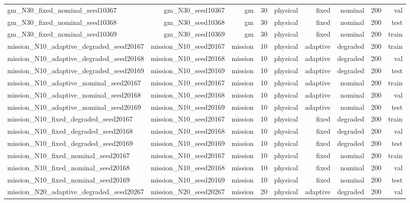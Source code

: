 \begin{tabular}{lrrrrrrrr}
gm\_N30\_fixed\_nominal\_seed10367 & gm\_N30\_seed10367 & gm & 30 & physical & fixed & nominal & 200 & val \\
gm\_N30\_fixed\_nominal\_seed10368 & gm\_N30\_seed10368 & gm & 30 & physical & fixed & nominal & 200 & test \\
gm\_N30\_fixed\_nominal\_seed10369 & gm\_N30\_seed10369 & gm & 30 & physical & fixed & nominal & 200 & train \\
mission\_N10\_adaptive\_degraded\_seed20167 & mission\_N10\_seed20167 & mission & 10 & physical & adaptive & degraded & 200 & train \\
mission\_N10\_adaptive\_degraded\_seed20168 & mission\_N10\_seed20168 & mission & 10 & physical & adaptive & degraded & 200 & val \\
mission\_N10\_adaptive\_degraded\_seed20169 & mission\_N10\_seed20169 & mission & 10 & physical & adaptive & degraded & 200 & test \\
mission\_N10\_adaptive\_nominal\_seed20167 & mission\_N10\_seed20167 & mission & 10 & physical & adaptive & nominal & 200 & train \\
mission\_N10\_adaptive\_nominal\_seed20168 & mission\_N10\_seed20168 & mission & 10 & physical & adaptive & nominal & 200 & val \\
mission\_N10\_adaptive\_nominal\_seed20169 & mission\_N10\_seed20169 & mission & 10 & physical & adaptive & nominal & 200 & test \\
mission\_N10\_fixed\_degraded\_seed20167 & mission\_N10\_seed20167 & mission & 10 & physical & fixed & degraded & 200 & train \\
mission\_N10\_fixed\_degraded\_seed20168 & mission\_N10\_seed20168 & mission & 10 & physical & fixed & degraded & 200 & val \\
mission\_N10\_fixed\_degraded\_seed20169 & mission\_N10\_seed20169 & mission & 10 & physical & fixed & degraded & 200 & test \\
mission\_N10\_fixed\_nominal\_seed20167 & mission\_N10\_seed20167 & mission & 10 & physical & fixed & nominal & 200 & train \\
mission\_N10\_fixed\_nominal\_seed20168 & mission\_N10\_seed20168 & mission & 10 & physical & fixed & nominal & 200 & val \\
mission\_N10\_fixed\_nominal\_seed20169 & mission\_N10\_seed20169 & mission & 10 & physical & fixed & nominal & 200 & test \\
mission\_N20\_adaptive\_degraded\_seed20267 & mission\_N20\_seed20267 & mission & 20 & physical & adaptive & degraded & 200 & val \\

\end{tabular}
